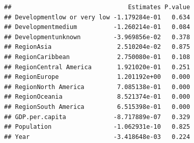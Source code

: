 \documentclass[11pt,]{article}
\newenvironment{Shaded}{\begin{snugshade}}{\end{snugshade}}
\newcommand{\CommentTok}[1]{\textcolor[rgb]{0.56,0.35,0.01}{\textit{#1}}}
\newcommand{\FloatTok}[1]{\textcolor[rgb]{0.00,0.00,0.81}{#1}}
\newcommand{\KeywordTok}[1]{\textcolor[rgb]{0.13,0.29,0.53}{\textbf{#1}}}
\newcommand{\NormalTok}[1]{#1}
\newcommand{\OperatorTok}[1]{\textcolor[rgb]{0.81,0.36,0.00}{\textbf{#1}}}
\newcommand{\StringTok}[1]{\textcolor[rgb]{0.31,0.60,0.02}{#1}}
\begin{document}
\begin{Shaded}
\end{Shaded}

\begin{verbatim}
##                                Estimates P.value
## Developmentlow or very low -1.179284e-01   0.634
## Developmentmedium          -1.260214e-01   0.084
## Developmentunknown         -3.969856e-02   0.378
## RegionAsia                  2.510204e-02   0.875
## RegionCaribbean             2.750080e-01   0.108
## RegionCentral America       1.921020e-01   0.251
## RegionEurope                1.201192e+00   0.000
## RegionNorth America         7.085138e-01   0.000
## RegionOceania               8.521374e-01   0.000
## RegionSouth America         6.515398e-01   0.000
## GDP.per.capita             -8.717889e-07   0.329
## Population                 -1.062931e-10   0.825
## Year                       -3.418648e-03   0.224
\end{verbatim}
\end{document}
